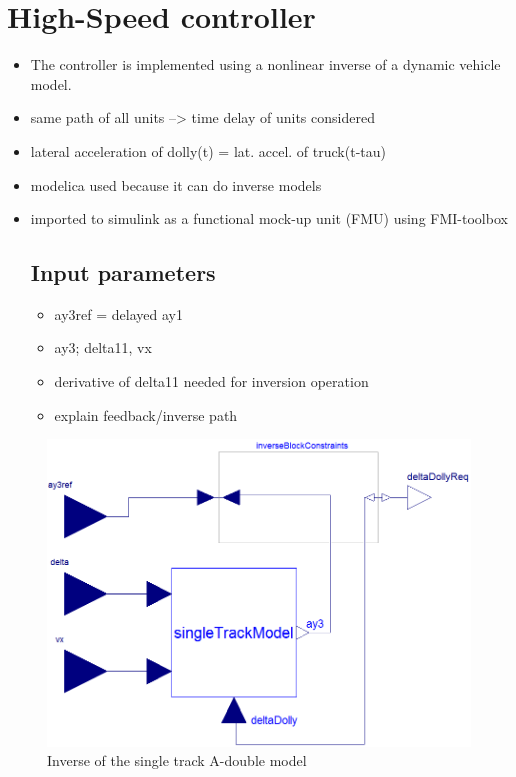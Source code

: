 \documentclass[ExampleMasters.tex]{subfiles}
\begin{document}
\section{High-Speed controller}
\label{sec:high-speed_controller}
\begin{itemize}
\item The controller is implemented using a nonlinear inverse of a dynamic vehicle model.
\item same path of all units --> time delay of units considered
\item lateral acceleration of dolly(t) = lat. accel. of truck(t-tau)
\item modelica used because it can do inverse models
\item imported to simulink as a functional mock-up unit (FMU) using FMI-toolbox
\subsection{Input parameters}
\label{sec:input_parameters_HS}

\begin{itemize}
	\item ay3ref = delayed ay1
	\item ay3; delta11, vx
	\item derivative of delta11 needed for inversion operation
	\item explain feedback/inverse path
	
\end{itemize}

\end{itemize}
 \begin{figure}[h]
 	\centering
 	\includegraphics[width=1.0\linewidth]{figures/Inverse_of_A-double_single-track}
 	\caption[]{Inverse of the single track A-double model \cite{High-speed_paper}}
 
 	\label{fig:inverse_model}
 \end{figure}
 
\end{document}
